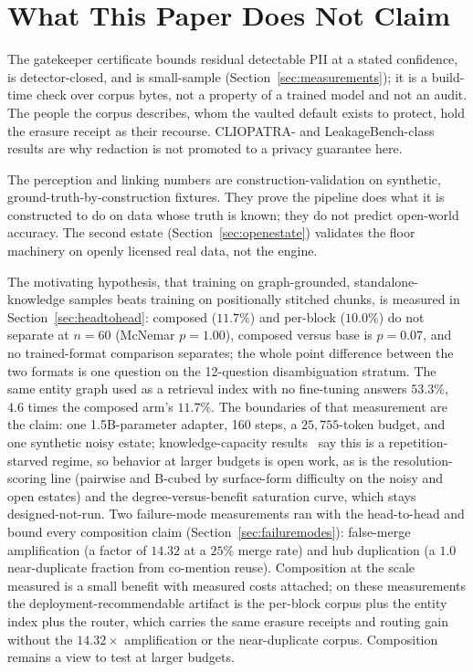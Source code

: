 \documentclass{article}
\begin{document}
\section{What This Paper Does Not Claim}
\label{sec:claims}

The gatekeeper certificate bounds residual detectable PII at a stated confidence, is detector-closed, and is small-sample (Section~\ref{sec:measurements}); it is a build-time check over corpus bytes, not a property of a trained model and not an audit. The people the corpus describes, whom the vaulted default exists to protect, hold the erasure receipt as their recourse. CLIOPATRA- and LeakageBench-class results are why redaction is not promoted to a privacy guarantee here.

The perception and linking numbers are construction-validation on synthetic, ground-truth-by-construction fixtures. They prove the pipeline does what it is constructed to do on data whose truth is known; they do not predict open-world accuracy. The second estate (Section~\ref{sec:openestate}) validates the floor machinery on openly licensed real data, not the engine.

The motivating hypothesis, that training on graph-grounded, standalone-knowledge samples beats training on positionally stitched chunks, is measured in Section~\ref{sec:headtohead}: composed ($11.7\%$) and per-block ($10.0\%$) do not separate at $n{=}60$ (McNemar $p{=}1.00$), composed versus base is $p{=}0.07$, and no trained-format comparison separates; the whole point difference between the two formats is one question on the 12-question disambiguation stratum. The same entity graph used as a retrieval index with no fine-tuning answers $53.3\%$, $4.6$ times the composed arm's $11.7\%$. The boundaries of that measurement are the claim: one 1.5B-parameter adapter, 160 steps, a $25{,}755$-token budget, and one synthetic noisy estate; knowledge-capacity results~\cite{allenzhu2024knowledge} say this is a repetition-starved regime, so behavior at larger budgets is open work, as is the resolution-scoring line (pairwise and B-cubed by surface-form difficulty on the noisy and open estates) and the degree-versus-benefit saturation curve, which stays designed-not-run. Two failure-mode measurements ran with the head-to-head and bound every composition claim (Section~\ref{sec:failuremodes}): false-merge amplification (a factor of $14.32$ at a $25\%$ merge rate) and hub duplication (a $1.0$ near-duplicate fraction from co-mention reuse). Composition at the scale measured is a small benefit with measured costs attached; on these measurements the deployment-recommendable artifact is the per-block corpus plus the entity index plus the router, which carries the same erasure receipts and routing gain without the $14.32\times$ amplification or the near-duplicate corpus. Composition remains a view to test at larger budgets.
\end{document}
